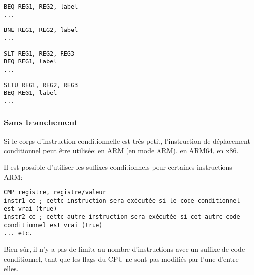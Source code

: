 \begin{lstlisting}[caption=Teste si les valeurs sont égales (Branch if EQual),style=customasmMIPS]
BEQ REG1, REG2, label
...
\end{lstlisting}

\begin{lstlisting}[caption=Teste si les valeurs ne sont pas égales (Branch if Not Equal),style=customasmMIPS]
BNE REG1, REG2, label
...
\end{lstlisting}

\begin{lstlisting}[caption=Teste si REG2 est plus petit que REG3 (signé),style=customasmMIPS]
SLT REG1, REG2, REG3
BEQ REG1, label
...
\end{lstlisting}

\begin{lstlisting}[caption=Teste si REG2 est plus petit que REG3 (non signé),style=customasmMIPS]
SLTU REG1, REG2, REG3
BEQ REG1, label
...
\end{lstlisting}

\subsubsection{Sans branchement}

Si le corps d'instruction conditionnelle est très petit, l'instruction de déplacement
conditionnel peut être utilisée:
 en ARM (en mode ARM),  en ARM64,  en x86.


Il est possible d'utiliser les suffixes conditionnels pour certaines instructions
ARM:

\begin{lstlisting}[caption=ARM (\ARMMode),style=customasmARM]
CMP registre, registre/valeur
instr1_cc ; cette instruction sera exécutée si le code conditionnel est vrai (true)
instr2_cc ; cette autre instruction sera exécutée si cet autre code conditionnel est vrai (true)
... etc.
\end{lstlisting}

Bien sûr, il n'y a pas de limite au nombre d'instructions avec un suffixe de code
conditionnel, tant que les flags du CPU ne sont pas modifiés par l'une d'entre elles.


